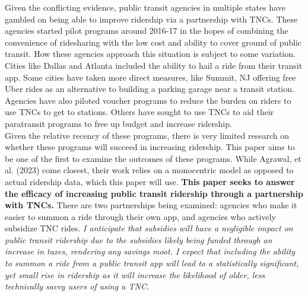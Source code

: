 \documentclass [11pt]{article}
\begin{document}
\indent Given the conflicting evidence, public transit agencies in multiple states have gambled on being able to improve ridership via a partnership with TNCs. These agencies started pilot programs around 2016-17 in the hopes of combining the convenience of ridesharing with the low cost and ability to cover ground of public transit. How these agencies approach this situation is subject to some variation. Cities like Dallas and Atlanta included the ability to hail a ride from their transit app. Some cities have taken more direct measures, like Summit, NJ offering free Uber rides as an alternative to building a parking garage near a transit station. Agencies have also piloted voucher programs to reduce the burden on riders to use TNCs to get to stations. Others have sought to use TNCs to aid their paratransit programs to free up budget and increase ridership.\\
\indent Given the relative recency of these programs, there is very limited research on whether these programs will succeed in increasing ridership. This paper aims to be one of the first to examine the outcomes of these programs. While Agrawal, et al. (2023) come closest, their work relies on a monocentric model as opposed to actual ridership data, which this paper will use. \textbf{This paper seeks to answer the efficacy of increasing public transit ridership through a partnership with TNCs.} There are two partnerships being examined: agencies who make it easier to summon a ride through their own app, and agencies who actively subsidize TNC rides. \textit{I anticipate that subsidies will have a negligible impact on public transit ridership due to the subsidies likely being funded through an increase in taxes, rendering any savings moot. I expect that including the ability to summon a ride from a public transit app will lead to a statistically significant, yet small rise in ridership as it will increase the likelihood of older, less technically savvy users of using a TNC.} \\
\end{document}
